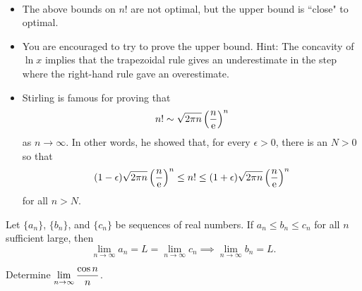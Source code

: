 \begin{remark}\,
\begin{itemize}
\item The above bounds on $n!$ are not optimal, but the upper bound is ``close" to optimal.
\item You are encouraged to try to prove the upper bound.
Hint: The concavity of $\ln x$ implies that the trapezoidal rule gives an underestimate in the step where the right-hand rule gave an overestimate.
\item Stirling is famous for proving that
\begin{equation*}
n!\sim \sqrt{2\pi n}\left(\frac{n}{\mathrm{e}}\right)^n
\end{equation*}
as $n\to\infty$.
In other words, he showed that, for every $\epsilon>0$, there is an $N>0$ so that
\begin{equation*}
(1-\epsilon) \sqrt{2\pi n}\left(\frac{n}{\mathrm{e}}\right)^n\le n!\le (1+\epsilon) \sqrt{2\pi n}\left(\frac{n}{\mathrm{e}}\right)^n
\end{equation*}
for all $n>N$.
\end{itemize}
\end{remark}

\newpage

\begin{theorem}
Let $\{a_n\}$, $\{b_n\}$, and $\{c_n\}$ be sequences of real numbers.
If $a_n\le b_n\le c_n$ for all $n$ sufficient large, then
\begin{equation*}
\lim_{n\to\infty}a_n = L = \lim_{n\to\infty}c_n \implies \lim_{n\to\infty}b_n= L.
\end{equation*}
\end{theorem}

\begin{example}
Determine $\displaystyle\lim_{n\to\infty}\frac{\cos n}{n}$.
\end{example}
\ifdefined\SOLUTION
{}
\else
\fi
\vfill


